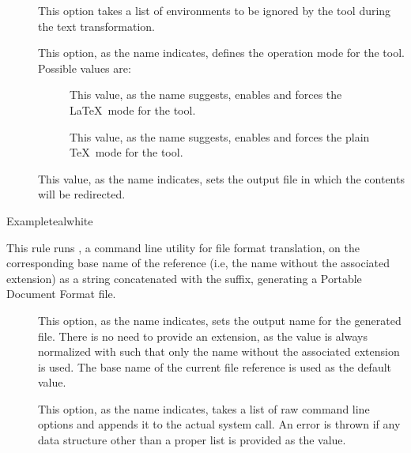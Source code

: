 \begin{description}
\begin{description}
\item[] This option takes a list of environments to be ignored by the tool during the text transformation.

\item[] This option, as the name indicates, defines the operation mode for the tool. Possible values are:

\begin{description}
\item[] This value, as the name suggests, enables and forces the \LaTeX\ mode for the tool.

\item[] This value, as the name suggests, enables and forces the plain \TeX\ mode for the tool.
\end{description}

\item[] This value, as the name indicates, sets the output file in which the contents will be redirected.
\end{description}

\begin{codebox}{Example}{teal}{\icnote}{white}
\end{codebox}

\item[\rulebox{dvipdfm}]
This rule runs , a command line utility for file format translation, on the corresponding base name of the  reference (i.e, the name without the associated extension) as a string concatenated with the  suffix, generating a Portable Document Format  file.

\begin{description}
\item[] This option, as the name indicates, sets the output name for the generated  file. There is no need to provide an extension, as the value is always normalized with  such that only the name without the associated extension is used. The base name of the current file reference is used as the default value.

\item[] This option, as the name indicates, takes a list of raw command line options and appends it to the actual system call. An error is thrown if any data structure other than a proper list is provided as the value.
\end{description}


\end{description}
